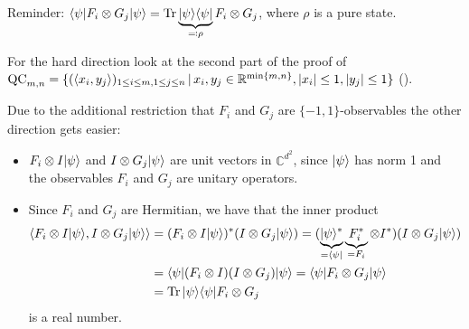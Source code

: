 	\begin{frame}
		\begin{pbmr}[label=Tsirelsonproof]
			Reminder: $\langle {\psi} \vert F_i\otimes G_j \vert {\psi} \rangle = \textup{Tr} \, {\underbrace{\vert {\psi} \rangle\langle {\psi} \vert}_{\eqqcolon\rho}F_i\otimes G_j} $, where $\rho$ is a pure state.
	
			For the hard direction look at the second part of the proof of $\textup{QC}_{m,n} = \{(\langle{x_i},{y_j}\rangle)_{1\leq i\leq m, 1\leq j \leq n} \,| \, x_i,y_j \in \mathbb{R}^{\min\{m,n\}}, {\left|{x_i}\right|}\leq 1, {\left|{y_j}\right|}\leq 1\}$ (\hyperlink{Tsirelson2<3>}{}).
			
			Due to the additional restriction that $F_i$ and $G_j$ are $\{-1,1\}$-observables the other direction gets easier: 
			\begin{itemize}
				\item<1-> $F_i\otimes I \vert {\psi} \rangle$ and $I\otimes G_j\vert {\psi} \rangle$ are unit vectors in $\mathbb{C}^{d^2}$, since $\vert {\psi} \rangle$ has norm 1 and the observables $F_i$ and $G_j$ are unitary operators.
				\item<2-> Since $F_i$ and $G_j$ are Hermitian, we have that the inner product
		\begin{align*}
			\sclr{F_i\tensor I \dr{\psi}}{I\tensor G_j \dr{\psi}} &= (F_i\tensor I \dr{\psi})^\ast(I\tensor G_j \dr{\psi}) 
			= (\underbrace{\dr{\psi}^\ast}_{=\dl{\psi}}\underbrace{F_i^\ast}_{=F_i}\tensor I^\ast)(I\tensor G_j \dr{\psi}) \\
			&= \dl{\psi}(F_i\tensor I)(I \tensor G_j) \dr{\psi}	%
			= \dl{\psi} F_i\tensor G_j \dr{\psi}\\
			&=\trace{\dr{\psi}\dl{\psi}F_i\tensor G_j}
		\end{align*}
		is a real number.
			\end{itemize} 
		\end{pbmr}
	\end{frame}
